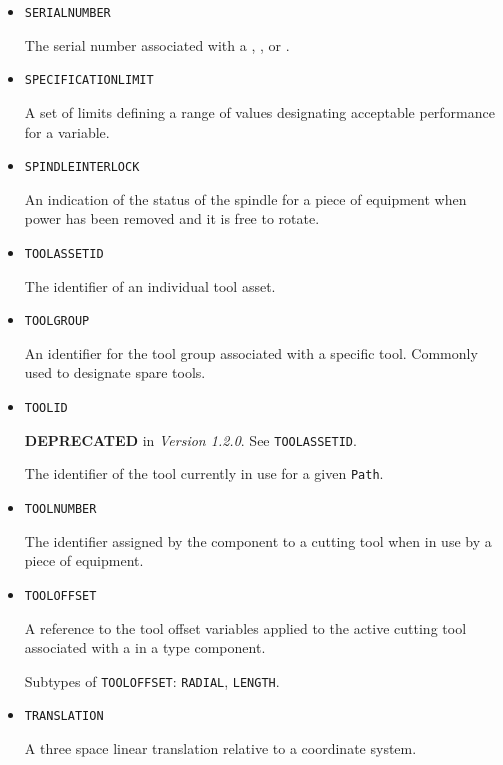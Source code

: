 \begin{itemize}
\item \texttt{SERIAL\textunderscore NUMBER}  

The serial number associated with a , , or .


\item \texttt{SPECIFICATION\textunderscore LIMIT}  

A set of limits defining a range of values designating acceptable performance for a variable.


\item \texttt{SPINDLE\textunderscore INTERLOCK}  

An indication of the status of the spindle for a piece of equipment when power has been removed and it is free to rotate.


\item \texttt{TOOL\textunderscore ASSET\textunderscore ID}  

The identifier of an individual tool asset.


\item \texttt{TOOL\textunderscore GROUP}  

An identifier for the tool group associated with a specific tool. Commonly used to designate spare tools.


\item \texttt{TOOL\textunderscore ID}  

\textbf{DEPRECATED} in \textit{Version 1.2.0}.   See \texttt{TOOL\textunderscore ASSET\textunderscore ID}.

The identifier of the tool currently in use for a given \texttt{Path}.


\item \texttt{TOOL\textunderscore NUMBER}  

The identifier assigned by the  component to a cutting tool when in use by a piece of equipment.


\item \texttt{TOOL\textunderscore OFFSET}  

A reference to the tool offset variables applied to the active cutting tool associated with a  in a  type component.

Subtypes of \texttt{TOOL\textunderscore OFFSET}: \texttt{RADIAL}, \texttt{LENGTH}.

\item \texttt{TRANSLATION}  

A three space linear translation relative to a coordinate system.



\end{itemize}
